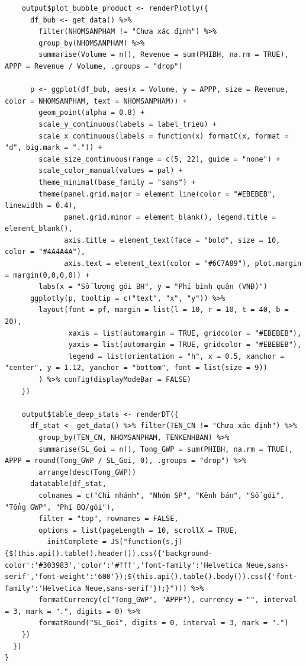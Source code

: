 \documentclass[12pt, a4paper]{article}
\begin{document}
\begin{lstlisting}
    output$plot_bubble_product <- renderPlotly({
      df_bub <- get_data() %>%
        filter(NHOMSANPHAM != "Chưa xác định") %>%
        group_by(NHOMSANPHAM) %>%
        summarise(Volume = n(), Revenue = sum(PHIBH, na.rm = TRUE), APPP = Revenue / Volume, .groups = "drop")

      p <- ggplot(df_bub, aes(x = Volume, y = APPP, size = Revenue, color = NHOMSANPHAM, text = NHOMSANPHAM)) +
        geom_point(alpha = 0.8) +
        scale_y_continuous(labels = label_trieu) +
        scale_x_continuous(labels = function(x) formatC(x, format = "d", big.mark = ".")) +
        scale_size_continuous(range = c(5, 22), guide = "none") +
        scale_color_manual(values = pal) +
        theme_minimal(base_family = "sans") +
        theme(panel.grid.major = element_line(color = "#EBEBEB", linewidth = 0.4),
              panel.grid.minor = element_blank(), legend.title = element_blank(),
              axis.title = element_text(face = "bold", size = 10, color = "#4A4A4A"),
              axis.text = element_text(color = "#6C7A89"), plot.margin = margin(0,0,0,0)) +
        labs(x = "Số lượng gói BH", y = "Phí bình quân (VNĐ)")
      ggplotly(p, tooltip = c("text", "x", "y")) %>%
        layout(font = pf, margin = list(l = 10, r = 10, t = 40, b = 20),
               xaxis = list(automargin = TRUE, gridcolor = "#EBEBEB"),
               yaxis = list(automargin = TRUE, gridcolor = "#EBEBEB"),
               legend = list(orientation = "h", x = 0.5, xanchor = "center", y = 1.12, yanchor = "bottom", font = list(size = 9))
        ) %>% config(displayModeBar = FALSE)
    })

    output$table_deep_stats <- renderDT({
      df_stat <- get_data() %>% filter(TEN_CN != "Chưa xác định") %>%
        group_by(TEN_CN, NHOMSANPHAM, TENKENHBAN) %>%
        summarise(SL_Goi = n(), Tong_GWP = sum(PHIBH, na.rm = TRUE), APPP = round(Tong_GWP / SL_Goi, 0), .groups = "drop") %>%
        arrange(desc(Tong_GWP))
      datatable(df_stat,
        colnames = c("Chi nhánh", "Nhóm SP", "Kênh bán", "Số gói", "Tổng GWP", "Phí BQ/gói"),
        filter = "top", rownames = FALSE,
        options = list(pageLength = 10, scrollX = TRUE,
          initComplete = JS("function(s,j){$(this.api().table().header()).css({'background-color':'#303983','color':'#fff','font-family':'Helvetica Neue,sans-serif','font-weight':'600'});$(this.api().table().body()).css({'font-family':'Helvetica Neue,sans-serif'});}"))) %>%
        formatCurrency(c("Tong_GWP", "APPP"), currency = "", interval = 3, mark = ".", digits = 0) %>%
        formatRound("SL_Goi", digits = 0, interval = 3, mark = ".")
    })
  })
}
\end{lstlisting}
\newpage
\end{document}
